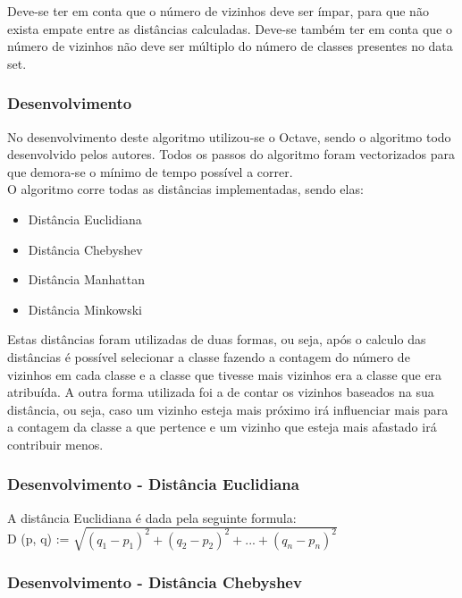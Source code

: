 \documentclass[portugues,final]{revdetua}
\begin{document}
Deve-se ter em conta que o número de vizinhos deve ser ímpar, para que não exista empate entre as distâncias calculadas. Deve-se também ter em conta que o número de vizinhos não deve ser múltiplo do número de classes presentes no data set.\\

\subsubsection{Desenvolvimento}

No desenvolvimento deste algoritmo utilizou-se o Octave, sendo o algoritmo todo desenvolvido pelos autores. Todos os passos do algoritmo foram vectorizados para que demora-se o mínimo de tempo possível a correr.\\

O algoritmo corre todas as distâncias implementadas, sendo elas:

\begin{itemize}
	\item Distância Euclidiana
	\item Distância Chebyshev
	\item Distância Manhattan
	\item Distância Minkowski
\end{itemize}

Estas distâncias foram utilizadas de duas formas, ou seja, após o calculo das distâncias é possível selecionar a classe fazendo a contagem do número de vizinhos em cada classe e a classe que tivesse mais vizinhos era a classe que era atribuída. A outra forma utilizada foi a de contar os vizinhos baseados na sua distância, ou seja, caso um vizinho esteja mais próximo irá influenciar mais para a contagem da classe a que pertence e um vizinho que esteja mais afastado irá contribuir menos.\\

\subsubsection{Desenvolvimento - Distância Euclidiana}

A distância Euclidiana é dada pela seguinte formula:\\

D (p, q) := $\sqrt{(q_1 - p_1)^2 + (q_2 - p_2)^2 + ... + (q_n - p_n)^2}$\\

\subsubsection{Desenvolvimento - Distância Chebyshev}
\end{document}
